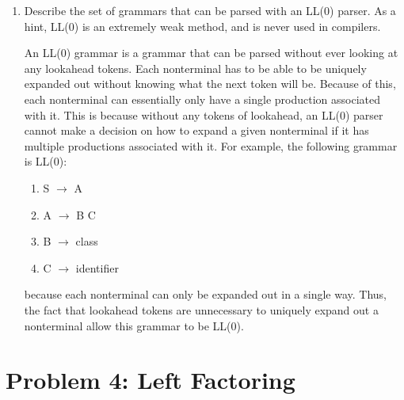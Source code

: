 \documentclass{article}
\begin{document}
\begin{enumerate}
	\item Describe the set of grammars that can be parsed with an LL(0)
		parser. As a hint, LL(0) is an extremely weak method, and is
		never used in compilers.

		An LL(0) grammar is a grammar that can be parsed without ever
		looking at any lookahead tokens. Each nonterminal has to be
		able to be uniquely expanded out without knowing what the next
		token will be. Because of this, each nonterminal can
		essentially only have a single production associated with it.
		This is because without any tokens of lookahead, an LL(0) parser
		cannot make a decision on how to expand a given nonterminal if
		it has multiple productions associated with it. For example, the
		following grammar is LL(0):
		\begin{enumerate}[(1)]
			\item S $\to$ A
			\item A $\to$ B C
			\item B $\to$ class
			\item C $\to$ identifier
		\end{enumerate}
		because each nonterminal can only be expanded out in a single
		way. Thus, the fact that lookahead tokens are unnecessary to
		uniquely expand out a nonterminal allow this grammar to be
		LL(0).
\end{enumerate}

\section{Problem 4: Left Factoring}
\end{document}
